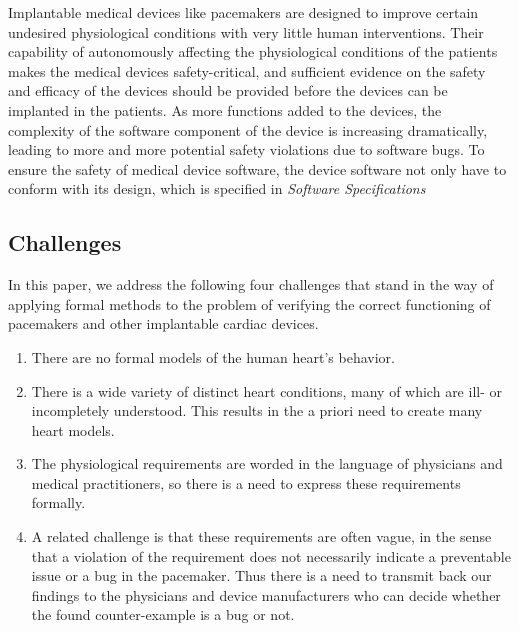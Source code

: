 Implantable medical devices like pacemakers are designed to improve certain undesired physiological conditions with very little human interventions. Their capability of autonomously affecting the physiological conditions of the patients makes the medical devices safety-critical, and sufficient evidence on the safety and efficacy of the devices should be provided before the devices can be implanted in the patients. As more functions added to the devices, the complexity of the software component of the device is increasing dramatically, leading to more and more potential safety violations due to software bugs. To ensure the safety of medical device software, the device software not only have to conform with its design, which is specified in \emph{Software Specifications}

\subsection{Challenges}
In this paper, we address the following four challenges that stand in the way of applying formal methods to the problem of verifying the correct functioning of pacemakers and other implantable cardiac devices.

\begin{enumerate}
	\item There are no formal models of the human heart's behavior.
	\item There is a wide variety of distinct heart conditions, many of which are ill- or incompletely understood.
	This results in the a priori need to create many heart models.
	\item The physiological requirements are worded in the language of physicians and medical practitioners, so there is a need to express these requirements formally.
	\item A related challenge is that these requirements are often vague, in the sense that a violation of the requirement does not necessarily indicate a preventable issue or a bug in the pacemaker. 
	Thus there is a need to transmit back our findings to the physicians and device manufacturers who can decide whether the found counter-example is a bug or not.
\end{enumerate}


